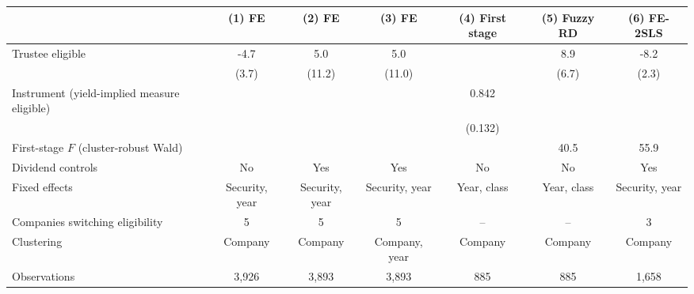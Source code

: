 \begin{tabular}{lcccccc}
\toprule
 & (1) FE & (2) FE & (3) FE & (4) First stage & (5) Fuzzy RD & (6) FE-2SLS \\
\midrule
Trustee eligible & -4.7 & 5.0 & 5.0 &  & 8.9 & -8.2 \\
 & (3.7) & (11.2) & (11.0) &  & (6.7) & (2.3) \\
Instrument (yield-implied measure eligible) &  &  &  & 0.842 &  &  \\
 &  &  &  & (0.132) &  &  \\
First-stage $F$ (cluster-robust Wald) &  &  &  &  & 40.5 & 55.9 \\
Dividend controls & No & Yes & Yes & No & No & Yes \\
Fixed effects & Security, year & Security, year & Security, year & Year, class & Year, class & Security, year \\
Companies switching eligibility & 5 & 5 & 5 & -- & -- & 3 \\
Clustering & Company & Company & Company, year & Company & Company & Company \\
Observations & 3,926 & 3,893 & 3,893 & 885 & 885 & 1,658 \\
\bottomrule
\end{tabular}

